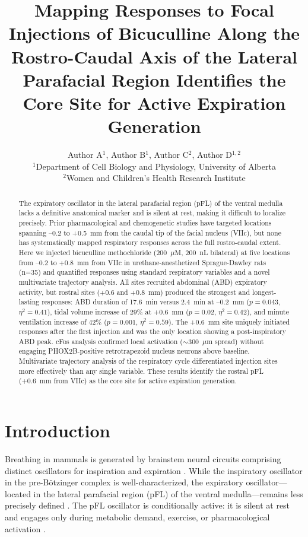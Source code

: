 \documentclass[11pt]{article}
\title{Mapping Responses to Focal Injections of Bicuculline Along the Rostro-Caudal Axis of the Lateral Parafacial Region Identifies the Core Site for Active Expiration Generation}
\author{Author A$^{1}$, Author B$^{1}$, Author C$^{2}$, Author D$^{1,2}$\\[6pt]
$^{1}$Department of Cell Biology and Physiology, University of Alberta\\
$^{2}$Women and Children's Health Research Institute}
\date{}
\begin{document}
\maketitle

\begin{abstract}
The expiratory oscillator in the lateral parafacial region (pFL) of the ventral medulla lacks a definitive anatomical marker and is silent at rest, making it difficult to localize precisely. Prior pharmacological and chemogenetic studies have targeted locations spanning --0.2 to +0.5~mm from the caudal tip of the facial nucleus (VIIc), but none has systematically mapped respiratory responses across the full rostro-caudal extent. Here we injected bicuculline methochloride (200~$\mu$M, 200~nL bilateral) at five locations from --0.2 to +0.8~mm from VIIc in urethane-anesthetized Sprague-Dawley rats (n=35) and quantified responses using standard respiratory variables and a novel multivariate trajectory analysis. All sites recruited abdominal (ABD) expiratory activity, but rostral sites (+0.6 and +0.8~mm) produced the strongest and longest-lasting responses: ABD duration of 17.6~min versus 2.4~min at --0.2~mm ($p=0.043$, $\eta^2=0.41$), tidal volume increase of 29\% at +0.6~mm ($p=0.02$, $\eta^2=0.42$), and minute ventilation increase of 42\% ($p=0.001$, $\eta^2=0.59$). The +0.6~mm site uniquely initiated responses after the first injection and was the only location showing a post-inspiratory ABD peak. cFos analysis confirmed local activation (${\sim}$300~$\mu$m spread) without engaging PHOX2B-positive retrotrapezoid nucleus neurons above baseline. Multivariate trajectory analysis of the respiratory cycle differentiated injection sites more effectively than any single variable. These results identify the rostral pFL (+0.6~mm from VIIc) as the core site for active expiration generation.
\end{abstract}

\section{Introduction}

Breathing in mammals is generated by brainstem neural circuits comprising distinct oscillators for inspiration and expiration \citep{feldman2013breathing, smith2013brainstem}. While the inspiratory oscillator in the pre-B\"{o}tzinger complex is well-characterized, the expiratory oscillator---located in the lateral parafacial region (pFL) of the ventral medulla---remains less precisely defined \citep{janczewski2006expiratory, pagliardini2011active}. The pFL oscillator is conditionally active: it is silent at rest and engages only during metabolic demand, exercise, or pharmacological activation \citep{abdala2009abdominal, anderson2016parafacial}.
\end{document}
